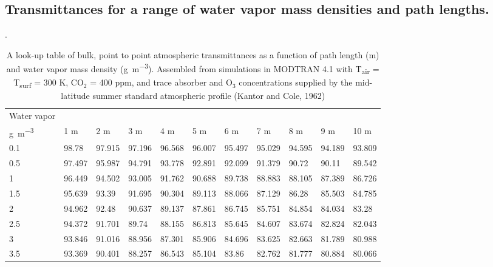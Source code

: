 \begin{bibunit}

\chapter{Transmittances for a range of water vapor mass densities and path lengths.}
\label{appendixa}
\newpage 
\begin{table}[]
	\centering
	\scriptsize
	\caption{A look-up table of bulk, point to point atmospheric transmittances as a function of path length (\si{\meter}) and water vapor mass density (\si{\gram\per\meter\cubed}). Assembled from simulations in MODTRAN 4.1 with T\textsubscript{air} = T\textsubscript{surf} = $300$ \si{\kelvin}, CO$_2$ = 400 \si{ppm}, and trace absorber and O$_3$ concentrations supplied by the mid-latitude summer standard atmospheric profile (Kantor and Cole, 1962)}.
	\label{a1}
	\begin{tabular}{lllllllllll}
		\toprule
		Water vapor &&&&&&&&&&\\
		\si{\gram\per\meter\cubed}& 1 \si{\meter}      & 2 \si{\meter}      & 3 \si{\meter}      & 4 \si{\meter}      & 5 \si{\meter}      & 6 \si{\meter}      & 7 \si{\meter}     & 8 \si{\meter}     & 9 \si{\meter}     & 10 \si{\meter}    \\
		\midrule
			0.1  & 98.78  & 97.915 & 97.196 & 96.568 & 96.007 & 95.497 & 95.029 & 94.595 & 94.189 & 93.809 \\
			0.5  & 97.497 & 95.987 & 94.791 & 93.778 & 92.891 & 92.099 & 91.379 & 90.72  & 90.11  & 89.542 \\
			1    & 96.449 & 94.502 & 93.005 & 91.762 & 90.688 & 89.738 & 88.883 & 88.105 & 87.389 & 86.726 \\
			1.5  & 95.639 & 93.39  & 91.695 & 90.304 & 89.113 & 88.066 & 87.129 & 86.28  & 85.503 & 84.785 \\
			2    & 94.962 & 92.48  & 90.637 & 89.137 & 87.861 & 86.745 & 85.751 & 84.854 & 84.034 & 83.28  \\
			2.5  & 94.372 & 91.701 & 89.74  & 88.155 & 86.813 & 85.645 & 84.607 & 83.674 & 82.824 & 82.043 \\
			3    & 93.846 & 91.016 & 88.956 & 87.301 & 85.906 & 84.696 & 83.625 & 82.663 & 81.789 & 80.988 \\
			3.5  & 93.369 & 90.401 & 88.257 & 86.543 & 85.104 & 83.86  & 82.762 & 81.777 & 80.884 & 80.066 \\

\end{tabular}
\end{table}
\end{bibunit}
